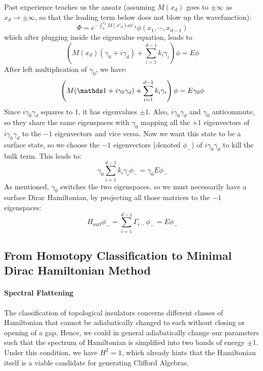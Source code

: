 \documentclass{article}
\begin{document}
Past experience teaches us the ansatz (assuming
$M(x_d)$ goes to $\pm\infty$ as $x_d\to\pm\infty$, so that the leading term below
does not blow up the wavefunction):
\begin{equation}
    \Phi = e^{-\int_0^{x_d} M(x'_d)\dd{x'_d}} \phi(x_1,\cdots,x_{d-1})
\end{equation}
which after plugging inside the eigenvalue equation, leads to
\begin{equation}
    \left( M(x_d)(\gamma_0 + i\gamma_d) + \sum_{i=1}^{d-1} k_i\gamma_i \right) \phi
    = E \phi
\end{equation}
After left multiplication of $\gamma_0$, we have:
\begin{equation}
    \left( M(\id + i\gamma_0\gamma_d) + \sum_{i=1}^{d-1} k_i\gamma_i  \right) \phi
    = E \gamma_0 \phi
\end{equation}
Since $i\gamma_0\gamma_d$ squares to $1$, it has eigenvalues $\pm1$. Also,
$i\gamma_0\gamma_d$ and $\gamma_0$ anticommute, so they share the same
eigenspaces with $\gamma_0$ mapping all the $+1$ eigenvectors of
$i\gamma_0\gamma_d$ to the $-1$ eigenvectors and vice versa. Now we want this
state to be a surface state, so we choose the $-1$ eigenvectors (denoted
$\phi_-$) of $i\gamma_0\gamma_d$ to kill the bulk term. This leads to:
\begin{equation}
    \gamma_0 \sum_{i=1}^{d-1} k_i\gamma_i \phi_- = \gamma_0 E\phi_-
\end{equation}
As mentioned, $\gamma_0$ switches the two eigenspaces, so we must necessarily
have a surface Dirac Hamiltonian, by projecting all those matrices to the $-1$
eigenspaces:
\begin{equation}
    \label{eq:H-Dirac-surf}
    H_\mathrm{surf} \phi_- = \sum_{i=1}^{d-1} \Gamma_{i-} \phi_- = E \phi_-
\end{equation}


\subsection{From Homotopy Classification to Minimal Dirac Hamiltonian Method}
\label{sec:Homotopy to Minimal Dirac}

\paragraph{Spectral Flattening} The classification of topological insulators
concerns different classes of Hamiltonian that cannot be adiabatically changed
to each without closing or opening of a gap. Hence, we could in general
adiabatically change our parameters such that the spectrum of Hamiltonian is
simplified into two bands of energy $\pm1$. Under this condition, we have
$H^2=1$, which already hints that the Hamiltonian itself is a viable candidate
for generating Clifford Algebras. 
\end{document}
